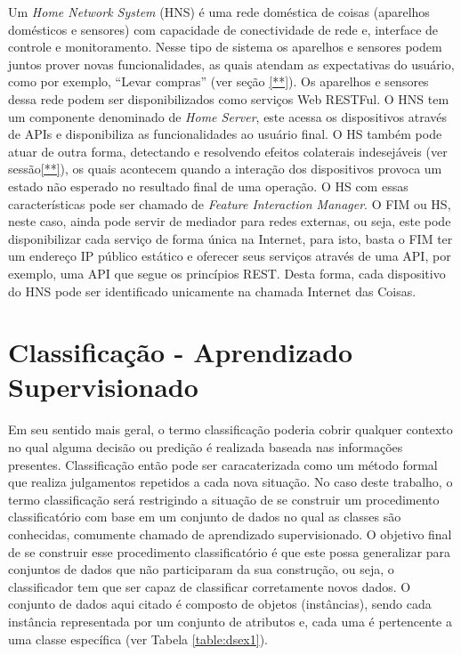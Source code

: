 Um \textit{Home Network System} (HNS) é uma rede doméstica de coisas (aparelhos domésticos e sensores) com capacidade de conectividade de rede e, interface de controle e monitoramento. Nesse tipo de sistema os aparelhos e sensores podem juntos prover novas funcionalidades, as quais atendam as expectativas do usuário, como por exemplo, ``Levar compras'' (ver seção \ref{**}). Os aparelhos e sensores dessa rede podem ser disponibilizados como serviços Web RESTFul. O HNS tem um componente denominado de \textit{Home Server}, este acessa os dispositivos através de APIs e disponibiliza as funcionalidades ao usuário final. O HS também pode atuar de outra forma, detectando e resolvendo efeitos colaterais indesejáveis (ver sessão\ref{**}), os quais acontecem quando a interação dos dispositivos provoca um estado não esperado no resultado final de uma operação. O HS com essas características pode ser chamado de \textit{Feature Interaction Manager}. O FIM ou HS, neste caso, ainda pode servir de mediador para redes externas, ou seja, este pode disponibilizar cada serviço de forma única na Internet, para isto, basta o FIM ter um endereço IP público estático e oferecer seus serviços através de uma API, por exemplo, uma API que segue os princípios REST. Desta forma, cada dispositivo do HNS pode ser identificado unicamente na chamada Internet das Coisas. \cite{Nakamura:2009}\cite{Ikegami:2013}

\section{Classificação - Aprendizado Supervisionado}
Em seu sentido mais geral, o termo classificação poderia cobrir qualquer contexto no qual alguma decisão ou predição é realizada baseada nas informações presentes. Classificação então pode ser caracaterizada como um método formal que realiza julgamentos repetidos a cada nova situação. No caso deste trabalho, o termo classificação será restrigindo a situação de se construir um procedimento classificatório com base em um conjunto de dados no qual as classes são conhecidas, comumente chamado de aprendizado supervisionado\cite{Michie:1994}. O objetivo final de se construir esse procedimento classificatório é que este possa generalizar para conjuntos de dados que não participaram da sua construção, ou seja, o classificador tem que ser capaz de classificar corretamente novos dados\cite{Kotsiantis:2007}. O conjunto de dados aqui citado é composto de objetos (instâncias), sendo cada instância representada por um conjunto de atributos e, cada uma é pertencente a uma classe específica (ver Tabela \ref{table:dsex1}).

